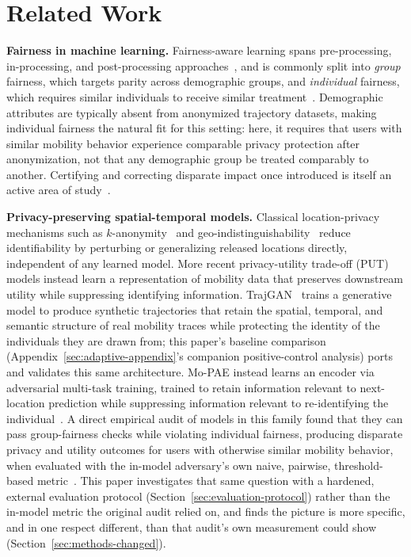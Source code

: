 \section{Related Work}
\label{sec:related-work}

\textbf{Fairness in machine learning.} Fairness-aware learning spans
pre-processing, in-processing, and post-processing
approaches~\cite{hardt2016equality}, and is commonly split into
\emph{group} fairness, which targets parity across demographic
groups, and \emph{individual} fairness, which requires similar
individuals to receive similar
treatment~\cite{dwork2012fairness,verma2018fairness}. Demographic
attributes are typically absent from anonymized trajectory datasets,
making individual fairness the natural fit for this setting: here, it
requires that users with similar mobility behavior experience
comparable privacy protection after anonymization, not that any
demographic group be treated comparably to another. Certifying and
correcting disparate impact once introduced is itself an active area
of study~\cite{feldman2015certifying,barocas2016big,mehrabi2021survey}.

\textbf{Privacy-preserving spatial-temporal models.} Classical
location-privacy mechanisms such as $k$-anonymity~\cite{sweeney2002k}
and geo-indistinguishability~\cite{andres2013geo} reduce identifiability
by perturbing or generalizing released locations directly, independent
of any learned model. More recent privacy-utility trade-off (PUT)
models instead learn a representation of mobility data that preserves
downstream utility while suppressing identifying information.
TrajGAN~\cite{rao2020lstm} trains a generative model to produce
synthetic trajectories that retain the spatial, temporal, and semantic
structure of real mobility traces while protecting the identity of the
individuals they are drawn from; this paper's baseline comparison
(Appendix~\ref{sec:adaptive-appendix}'s companion positive-control
analysis) ports and validates this same architecture. Mo-PAE instead
learns an encoder via adversarial multi-task training, trained to
retain information relevant to next-location prediction while
suppressing information relevant to re-identifying the
individual~\cite{zhan2023mopae}. A direct empirical audit of models in
this family found that they can pass group-fairness checks while
violating individual fairness, producing disparate privacy and utility
outcomes for users with otherwise similar mobility behavior, when
evaluated with the in-model adversary's own naive, pairwise,
threshold-based metric~\cite{zhan2023analysing}. This paper
investigates that same question with a hardened, external evaluation
protocol (Section~\ref{sec:evaluation-protocol}) rather than the
in-model metric the original audit relied on, and finds the picture is
more specific, and in one respect different, than that audit's
own measurement could show (Section~\ref{sec:methods-changed}).

